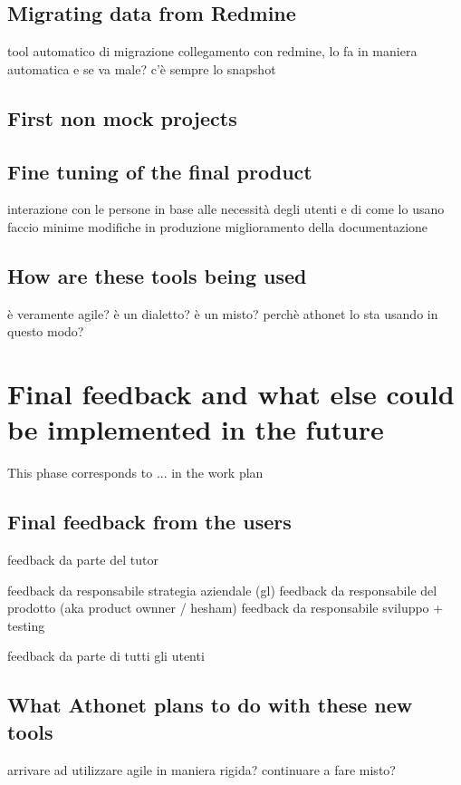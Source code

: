 	\subsection{Migrating data from Redmine}
		tool automatico di migrazione
		collegamento con redmine, lo fa in maniera automatica
		e se va male? c'è sempre lo snapshot
	
	\subsection{First non mock projects}
	
	\subsection{Fine tuning of the final product}
		interazione con le persone
		in base alle necessità degli utenti e di come lo usano faccio minime modifiche in produzione
		miglioramento della documentazione
	
	\subsection{How are these tools being used}
		è veramente agile? 
		è un dialetto?
		è un misto?
		perchè athonet lo sta usando in questo modo?

\section{Final feedback and what else could be implemented in the future}

	This phase corresponds to ... in the work plan

	\subsection{Final feedback from the users}
		feedback da parte del tutor
		
		feedback da responsabile strategia aziendale (gl)
		feedback da responsabile del prodotto (aka product ownner / hesham)
		feedback da responsabile sviluppo + testing
			
		feedback da parte di tutti gli utenti
	
	\subsection{What Athonet plans to do with these new tools}
		arrivare ad utilizzare agile in maniera rigida?
		continuare a fare misto?
